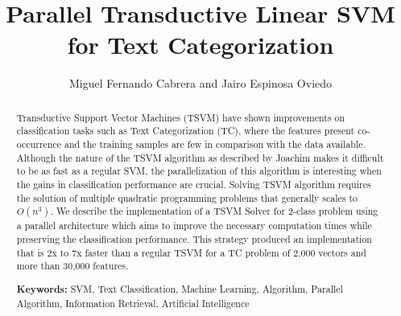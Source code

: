 



%


\title{Parallel Transductive Linear SVM for Text Categorization}

\author{Miguel Fernando Cabrera and Jairo Espinosa Oviedo}



\maketitle

\begin{abstract}
Transductive Support Vector Machines (TSVM) have shown improvements
on classification tasks such as Text Categorization (TC), where the
features present co-occurrence and the training samples are few in
comparison with the data available. Although the nature of the TSVM
algorithm as described by Joachim makes it difficult to be as fast
as a regular SVM, the parallelization of this algorithm is interesting
when the gains in classification performance are crucial. Solving
TSVM algorithm requires the solution of multiple quadratic programming
problems that generally scales to $O(n^{3})$. We describe the implementation
of a TSVM Solver for 2-class problem using a parallel architecture
which aims to improve the necessary computation times while preserving
the classification performance. This strategy produced an implementation 
that is 2x to 7x faster than a regular TSVM for a TC problem of 2,000 vectors 
and more than 30,000 features.

{\bf Keywords:} SVM, Text Classification, Machine Learning, Algorithm,
Parallel Algorithm, Information Retrieval, Artificial Intelligence

\end{abstract}


